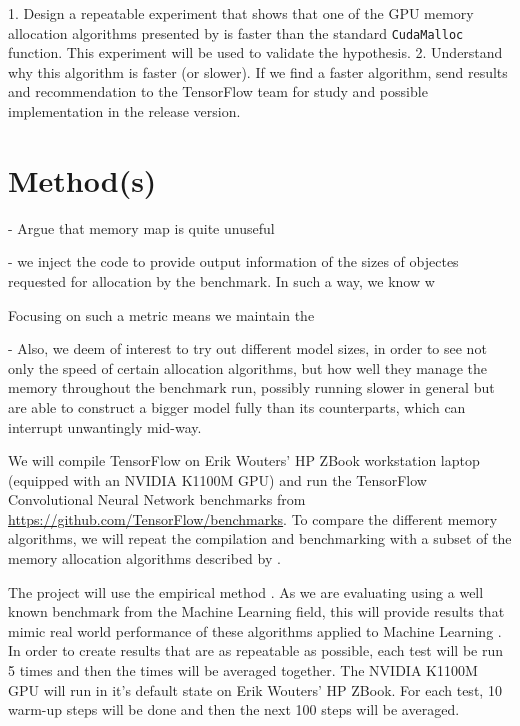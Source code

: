\documentclass[12pt,twoside]{article}
\begin{document}

1. Design a repeatable experiment that shows that one of the GPU memory allocation algorithms presented by \citeauthor{Vinkler2015} \cite{Vinkler2015} is faster than the standard \texttt{CudaMalloc} function. This experiment will be used to validate the hypothesis. 2. Understand why this algorithm is faster (or slower).
If we find a faster algorithm, send results and recommendation to the TensorFlow team for study and possible implementation in the release version.


\section{Method(s)}
\label{sec:methods}


- Argue that memory map is quite unuseful

-  we inject the code to provide output information of the sizes of objectes requested for allocation by the benchmark. In such a way, we know w

Focusing on such a metric means we maintain the 

- Also, we deem of interest to try out different model sizes, in order to see not only the speed of certain allocation algorithms, but how well they manage the memory throughout the benchmark run, possibly running slower in general but are able to construct a bigger model fully than its counterparts, which can interrupt unwantingly mid-way.


We will compile TensorFlow on Erik Wouters' HP ZBook workstation laptop (equipped with an NVIDIA K1100M GPU) and run the TensorFlow Convolutional Neural Network benchmarks from \url{https://github.com/TensorFlow/benchmarks}. To compare the different memory algorithms, we will repeat the compilation and benchmarking with a subset of the memory allocation algorithms described by \citeauthor{Vinkler2015} \cite{Vinkler2015}.

The project will use the empirical method \cite{bock2001}. As we are evaluating using a well known benchmark from the Machine Learning field, this will provide results that mimic real world performance of these algorithms applied to Machine Learning \cite{abadi2016}. In order to create results that are as repeatable as possible, each test will be run 5 times and then the times will be averaged together. The NVIDIA K1100M GPU will run in it's default state on Erik Wouters' HP ZBook. For each test, 10 warm-up steps will be done and then the next 100 steps will be averaged. 
\end{document}
